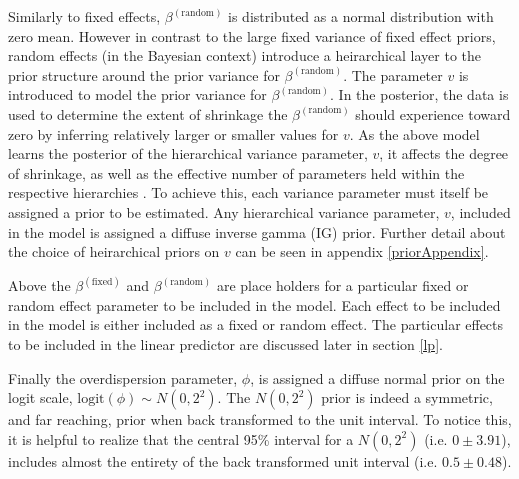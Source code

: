 \documentclass[12pt]{article}
\begin{document}
%
Similarly to fixed effects, $\beta^{(\text{random})}$ is distributed as a 
normal distribution with zero mean. However in contrast to the large 
fixed variance of fixed effect priors, random effects (in the Bayesian 
context) introduce a heirarchical layer to the prior structure around the prior 
variance for $\beta^{(\text{random})}$. The parameter $v$ is 
introduced to model the prior variance for $\beta^{(\text{random})}$. In the 
posterior, the data is used to determine the extent of shrinkage the 
$\beta^{(\text{random})}$ should experience toward zero by inferring 
relatively larger or smaller values for $v$. As the above model learns the 
posterior of the hierarchical variance parameter, $v$, it affects 
the degree of shrinkage, as well as the effective number of parameters held 
within the respective hierarchies \cite{gelman_bayesian_2013}. To achieve this, each 
variance parameter must itself be assigned a prior to be estimated. Any 
hierarchical variance parameter, $v$, included in the model is 
assigned a diffuse inverse gamma (IG) prior. Further detail about the choice 
of heirarchical priors on $v$ can be seen in appendix \ref{priorAppendix}.

%
Above the $\beta^{(\text{fixed})}$ and $\beta^{(\text{random})}$ are place 
holders for a particular fixed or random effect parameter to be included in the 
model. Each effect to be included in the model is either included as a fixed 
or random effect. The particular effects to be included in the linear 
predictor are discussed later in section \ref{lp}.

%
Finally the overdispersion parameter, \(\phi\), is assigned a diffuse
normal prior on the logit scale, \(\text{logit}(\phi) \sim N(0, 2^2)\).
The \(N(0, 2^2)\) prior is indeed a symmetric, and far reaching, prior
when back transformed to the unit interval. To notice this, it is
helpful to realize that the central 95\% interval for a \(N(0, 2^2)\)
(i.e. \(0\pm3.91\)), includes almost the entirety of the back
transformed unit interval (i.e. \(0.5\pm0.48\)).

\end{document}
